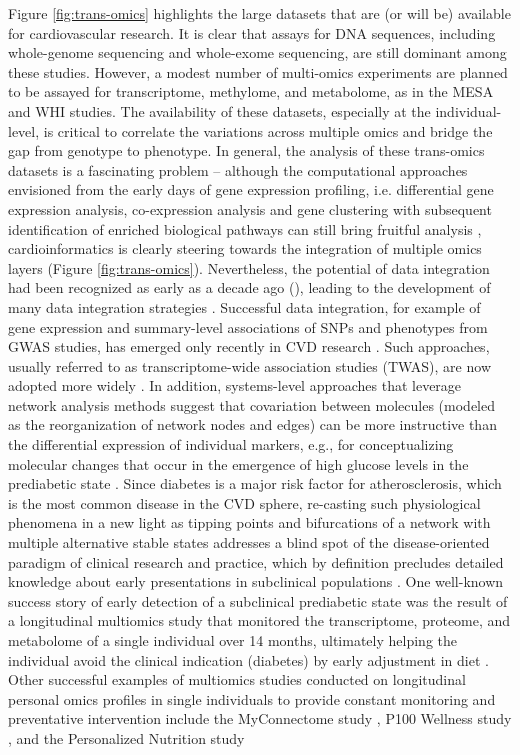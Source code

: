 \documentclass[letter]{bioinfo}
\begin{document}
	 Figure \ref{fig:trans-omics} highlights the large datasets that are (or will be) available for cardiovascular research. It is clear that assays for DNA sequences, including whole-genome sequencing and whole-exome sequencing, are still dominant among these studies. However, a modest number of multi-omics experiments are planned to be assayed for transcriptome, methylome, and metabolome, as in the MESA and WHI studies. The availability of these datasets, especially at the individual-level, is critical to correlate the variations across multiple omics and bridge the gap from genotype to phenotype.  In general, the analysis of these trans-omics datasets is a fascinating problem -- although the computational approaches envisioned from the early days of gene expression profiling, i.e. differential gene expression analysis, co-expression analysis and gene clustering with subsequent identification of enriched biological pathways \citep{Claverie:1999:Computational} can still bring fruitful analysis \citep{Santolini:2018:personalized}, cardioinformatics is clearly steering towards the integration of multiple omics layers (Figure \ref{fig:trans-omics}). Nevertheless, the potential of data integration had been recognized as early as a decade ago (\cite{Hawkins:2010:Nextgeneration}), leading to the development of many data integration strategies \citep{Ritchie:2015:Methods}. Successful data integration, for example of gene expression and summary-level associations of SNPs and phenotypes from GWAS studies, has emerged only recently in CVD research \citep{Gusev:2016:Integrative}. Such approaches, usually referred to as transcriptome-wide association studies (TWAS), are now adopted more widely \citep{Klarin:2018:Genetics}.  In addition, systems-level approaches that leverage network analysis methods suggest that covariation between molecules (modeled as the reorganization of network nodes and edges) can be more instructive than the differential expression of individual markers, e.g., for conceptualizing molecular changes that occur in the emergence of high glucose levels in the prediabetic state \cite{Trachana:2018:Taking,Lau:2018:Omics}.  Since diabetes is a major risk factor for atherosclerosis, which is the most common disease in the CVD sphere, re-casting such physiological phenomena in a new light as tipping points and bifurcations of a network with multiple alternative stable states addresses a blind spot of the disease-oriented paradigm of clinical research and practice, which by definition precludes detailed knowledge about early presentations in subclinical populations \cite{Lau:2018:Omics}.  One well-known success story of early detection of a subclinical prediabetic state was the result of a longitudinal multiomics study that monitored the transcriptome, proteome, and metabolome of a single individual over 14 months, ultimately helping the individual avoid the clinical indication (diabetes) by early adjustment in diet \citep{Chen:2012:Personal}.  Other successful examples of multiomics studies conducted on longitudinal personal omics profiles in single individuals to provide constant monitoring and preventative intervention include the MyConnectome study \citep{Poldrack:2015:Long-term}, P100 Wellness study \citep{Price:2017:Wellness}, and the Personalized Nutrition study 
\end{document}
